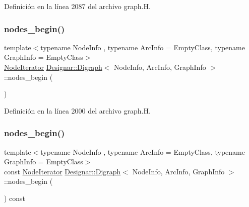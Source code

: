 Definición en la línea 2087 del archivo graph.\+H.

\mbox{\label{class_designar_1_1_digraph_af2a2ede7d4af852e67705f2c2bf394d2}} 
\subsubsection{\texorpdfstring{nodes\+\_\+begin()}{nodes\_begin()}\hspace{0.1cm}{\footnotesize\ttfamily [1/2]}}
{\footnotesize\ttfamily template$<$typename Node\+Info , typename Arc\+Info  = Empty\+Class, typename Graph\+Info  = Empty\+Class$>$ \\
\hyperlink{class_designar_1_1_digraph_1_1_node_iterator}{Node\+Iterator} \hyperlink{class_designar_1_1_digraph}{Designar\+::\+Digraph}$<$ Node\+Info, Arc\+Info, Graph\+Info $>$\+::nodes\+\_\+begin (\begin{DoxyParamCaption}{ }\end{DoxyParamCaption})\hspace{0.3cm}{\ttfamily [inline]}}



Definición en la línea 2000 del archivo graph.\+H.

\mbox{\label{class_designar_1_1_digraph_a6fcecdd41bdd4af1a0e1a7a5a3e8a3eb}} 
\subsubsection{\texorpdfstring{nodes\+\_\+begin()}{nodes\_begin()}\hspace{0.1cm}{\footnotesize\ttfamily [2/2]}}
{\footnotesize\ttfamily template$<$typename Node\+Info , typename Arc\+Info  = Empty\+Class, typename Graph\+Info  = Empty\+Class$>$ \\
const \hyperlink{class_designar_1_1_digraph_1_1_node_iterator}{Node\+Iterator} \hyperlink{class_designar_1_1_digraph}{Designar\+::\+Digraph}$<$ Node\+Info, Arc\+Info, Graph\+Info $>$\+::nodes\+\_\+begin (\begin{DoxyParamCaption}{ }\end{DoxyParamCaption}) const\hspace{0.3cm}{\ttfamily [inline]}}



